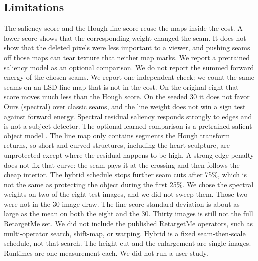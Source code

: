 \documentclass[10pt,twocolumn,letterpaper]{article}
\begin{document}
\subsection{Limitations}
The saliency score and the Hough line score reuse the maps inside the cost.
A lower score shows that the corresponding weight changed the seam.
It does not show that the deleted pixels were less important to a viewer, and pushing seams off those maps can tear texture that neither map marks.
We report a pretrained saliency model as an optional comparison. We do not report the summed forward energy of the chosen seams.
We report one independent check: we count the same seams on an LSD line map that is not in the cost.
On the original eight that score moves much less than the Hough score.
On the seeded 30 it does not favor Ours (spectral) over classic seams, and the line weight does not win a sign test against forward energy.
Spectral residual saliency responds strongly to edges and is not a subject detector. The optional learned comparison is a pretrained salient-object model \cite{qin2020u2net}.
The line map only contains segments the Hough transform returns, so short and curved structures, including the heart sculpture, are unprotected except where the residual happens to be high.
A strong-edge penalty does not fix that curve: the seam pays it at the crossing and then follows the cheap interior.
The hybrid schedule stops further seam cuts after 75\%, which is not the same as protecting the object during the first 25\%.
We chose the spectral weights on two of the eight test images, and we did not sweep them.
Those two were not in the 30-image draw.
The line-score standard deviation is about as large as the mean on both the eight and the 30.
Thirty images is still not the full RetargetMe set.
We did not include the published RetargetMe operators, such as multi-operator search, shift-map, or warping.
Hybrid is a fixed seam-then-scale schedule, not that search.
The height cut and the enlargement are single images.
Runtimes are one measurement each.
We did not run a user study.
\end{document}
